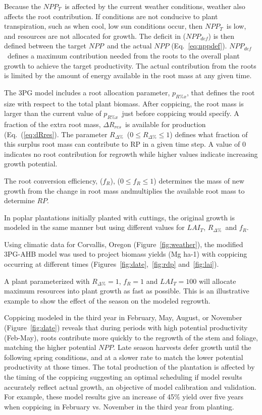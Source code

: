 \documentclass[10pt]{article}
\newcommand{\LAIt}{\ensuremath{LAI_{T}}}
\newcommand{\NPPdef}{\ensuremath{NPP_{def}}}
\newcommand{\NPPt}{\ensuremath{NPP_{T}}}
\newcommand{\NPP}{\ensuremath{NPP}}
\newcommand{\RP}{\ensuremath{RP}}
\newcommand{\Rdp}{\ensuremath{R_{\Delta\%}}}
\newcommand{\dRres}{\ensuremath{\Delta R_{res}}}
\newcommand{\fR}{\ensuremath{f_R}}
\newcommand{\pRx}{\ensuremath{p_{R\%x}}}
\begin{document}
Because the \NPPt~is affected by the current weather conditions, weather also
affects the root contribution. If conditions are not conducive to plant
transpiration, such as when cool, low sun conditions occur, then \NPPt~is low,
and resources are not allocated for growth. The deficit in (\NPPdef) is then
defined between the target \NPP~and the actual \NPP
(Eq.~\ref{eq:nppdef}). \NPPdef~defines a maximum contribution needed from the
roots to the overall plant growth to achieve the target productivity. The actual
contribution from the roots is limited by the amount of energy available in the
root mass at any given time.

The 3PG model includes a root allocation parameter, \pRx, that defines the root
size with respect to the total plant biomass. After coppicing, the root mass is
larger than the current value of \pRx~just before coppicing would specify. A
fraction of the extra root mass, \dRres~is available for production
(Eq.~(\ref{eq:dRres}). The parameter \Rdp~($0 ≤ \Rdp ≤ 1$) defines what fraction
of this surplus root mass can contribute to RP in a given time step. A value of
0 indicates no root contribution for regrowth while higher values indicate
increasing growth potential.

The root conversion efficiency, (\fR), ($0 ≤ \fR ≤ 1$) determines the mass of
new growth from the change in root mass andmultiplies the available root mass to
determine \RP.

In poplar plantations initially planted with cuttings, the original growth is
modeled in the same manner but using different values for \LAIt, \Rdp~and \fR.

Using climatic data for Corvallis, Oregon (Figure~\ref{fig:weather}), the
modified 3PG-AHB model was used to project biomass yields (Mg ha-1) with
coppicing occurring at different times (Figures~\ref{fig:date},~\ref{fig:rdp}
and~\ref{fig:lai}).

A plant parameterized with $\Rdp=1$, $\fR=1$ and $\LAIt=100$ will allocate
maximum resources into plant growth as fast as possible. This is an illustrative
example to show the effect of the season on the modeled regrowth.

Coppicing modeled in the third year in February, May, August, or November
(Figure~\ref{fig:date}) reveals that during periods with high potential
productivity (Feb-May), roots contribute more quickly to the regrowth of the
stem and foliage, matching the higher potential \NPP. Late season harvests defer
growth until the following spring conditions, and at a slower rate to match the
lower potential productivity at those times. The total production of the
plantation is affected by the timing of the coppicing suggesting an optimal
scheduling if model results accurately reflect actual growth, an objective of
model calibration and validation. For example, these model results give an
increase of 45\% yield over five years when coppicing in February vs. November
in the third year from planting.
\end{document}
